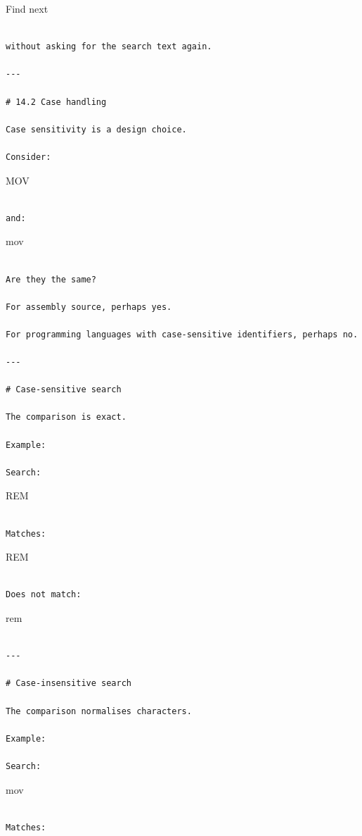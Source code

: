 \documentclass[
  oneside,
  openany]{book}
\begin{document}
Find next

\begin{verbatim}

without asking for the search text again.

---

# 14.2 Case handling

Case sensitivity is a design choice.

Consider:
\end{verbatim}

MOV

\begin{verbatim}

and:
\end{verbatim}

mov

\begin{verbatim}

Are they the same?

For assembly source, perhaps yes.

For programming languages with case-sensitive identifiers, perhaps no.

---

# Case-sensitive search

The comparison is exact.

Example:

Search:
\end{verbatim}

REM

\begin{verbatim}

Matches:
\end{verbatim}

REM

\begin{verbatim}

Does not match:
\end{verbatim}

rem

\begin{verbatim}

---

# Case-insensitive search

The comparison normalises characters.

Example:

Search:
\end{verbatim}

mov

\begin{verbatim}

Matches:
\end{verbatim}
\end{document}
